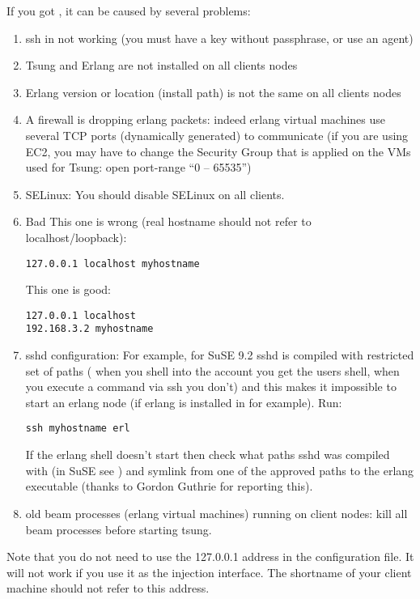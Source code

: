 \documentclass{TSUNG-en}
\begin{document}
\begin{appendix}
If you got , it can be caused by
several problems:
\begin{enumerate}
\item ssh in not working (you must have a key without passphrase, or
  use an agent)
\item Tsung and Erlang are not installed on all clients nodes
\item Erlang version or location (install path) is not the same on all clients nodes
\item A firewall is dropping erlang packets: indeed erlang virtual machines use
several TCP ports (dynamically generated) to communicate (if you are
using EC2, you may have to change the Security Group that is applied on the VMs used
for Tsung: open port-range “0 – 65535”)
\item SELinux: You should disable SELinux on all clients.
\item Bad 
This one is wrong (real hostname should not refer to localhost/loopback):
\begin{Verbatim}
127.0.0.1 localhost myhostname
\end{Verbatim}
This one is good:
\begin{Verbatim}
127.0.0.1 localhost
192.168.3.2 myhostname
\end{Verbatim}
\item sshd configuration:
For example, for SuSE 9.2 sshd is compiled with restricted set of
paths (\ie{} when you shell into the account you get the users shell,
when you execute a command via ssh you don't) and this makes it
impossible to start an erlang node (if erlang is installed in
 for example).
Run:

\begin{Verbatim}
ssh myhostname erl
\end{Verbatim}

If the erlang shell doesn't start then check what paths sshd was compiled with
(in SuSE see ) and symlink from one of the approved paths
to the erlang executable (thanks to Gordon Guthrie for reporting this).
\item old beam processes (erlang virtual machines) running on client nodes: kill all
  beam processes before starting tsung.
\end{enumerate}


Note that you do not need to use the 127.0.0.1 address in the configuration file.
It will not work if you use it as the injection interface. The shortname
of your client machine should not refer to this address.


\end{appendix}
\end{document}
